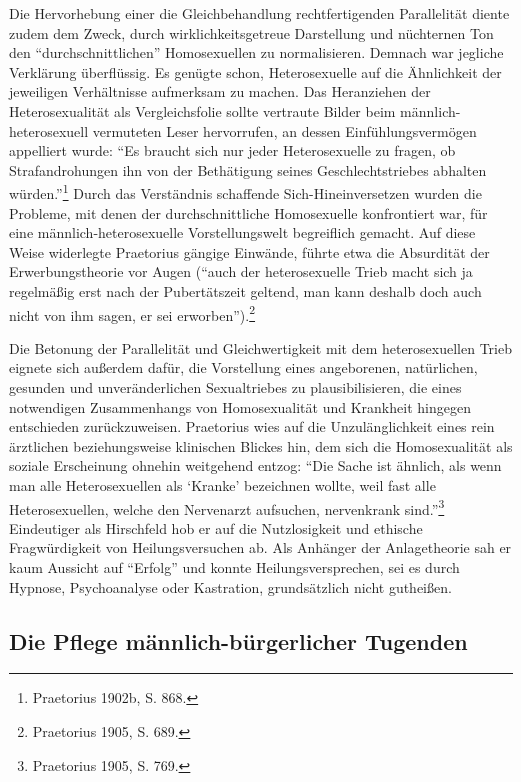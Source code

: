 \documentclass[a4paper,
fontsize=11pt,
oneside,
numbers=noperiodatend,
parskip=half-,
bibliography=totoc,
final
]{scrartcl}
\begin{document}
Die Hervorhebung einer die Gleichbehandlung rechtfertigenden
Parallelität diente zudem dem Zweck, durch wirklichkeitsgetreue
Darstellung und nüchternen Ton den \enquote{durchschnittlichen}
Homosexuellen zu normalisieren. Demnach war jegliche Verklärung
überflüssig. Es genügte schon, Heterosexuelle auf die Ähnlichkeit der
jeweiligen Verhältnisse aufmerksam zu machen. Das Heranziehen der
Heterosexualität als Vergleichsfolie sollte vertraute Bilder beim
männlich-heterosexuell vermuteten Leser hervorrufen, an dessen
Einfühlungsvermögen appelliert wurde: \enquote{Es braucht sich nur jeder
Heterosexuelle zu fragen, ob Strafandrohungen ihn von der Bethätigung
seines Geschlechtstriebes abhalten würden.}\footnote{Praetorius 1902b,
  S. 868.} Durch das Verständnis schaffende Sich-Hineinversetzen wurden
die Probleme, mit denen der durchschnittliche Homosexuelle konfrontiert
war, für eine männlich-heterosexuelle Vorstellungswelt begreiflich
gemacht. Auf diese Weise widerlegte Praetorius gängige Einwände, führte
etwa die Absurdität der Erwerbungstheorie vor Augen (\enquote{auch der
heterosexuelle Trieb macht sich ja regelmäßig erst nach der
Pubertätszeit geltend, man kann deshalb doch auch nicht von ihm sagen,
er sei erworben}).\footnote{Praetorius 1905, S. 689.}

Die Betonung der Parallelität und Gleichwertigkeit mit dem
heterosexuellen Trieb eignete sich außerdem dafür, die Vorstellung eines
angeborenen, natürlichen, gesunden und unveränderlichen Sexualtriebes zu
plausibilisieren, die eines notwendigen Zusammenhangs von Homosexualität
und Krankheit hingegen entschieden zurückzuweisen. Praetorius wies auf
die Unzulänglichkeit eines rein ärztlichen beziehungsweise klinischen
Blickes hin, dem sich die Homosexualität als soziale Erscheinung ohnehin
weitgehend entzog: \enquote{Die Sache ist ähnlich, als wenn man alle
Heterosexuellen als \enquote{Kranke} bezeichnen wollte, weil fast alle
Heterosexuellen, welche den Nervenarzt aufsuchen, nervenkrank
sind.}\footnote{Praetorius 1905, S. 769.} Eindeutiger als Hirschfeld hob
er auf die Nutzlosigkeit und ethische Fragwürdigkeit von
Heilungsversuchen ab. Als Anhänger der Anlagetheorie sah er kaum
Aussicht auf \enquote{Erfolg} und konnte Heilungsversprechen, sei es
durch Hypnose, Psychoanalyse oder Kastration, grundsätzlich nicht
gutheißen.

\subsection*{Die Pflege männlich-bürgerlicher
Tugenden}\label{die-pflege-muxe4nnlich-buxfcrgerlicher-tugenden}
\end{document}
